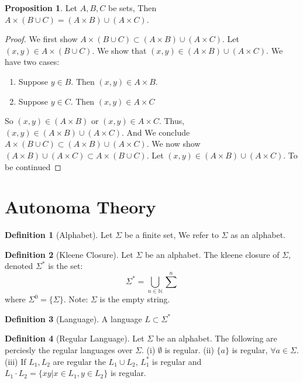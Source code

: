 \documentclass{article}
\theoremstyle{definition}
\newtheorem{define}{Definition}[section]
\newtheorem{prop}{Proposition}[section]
\begin{document}
\begin{prop}
Let $A, B, C$ be sets, Then $A\times (B\cup C) = (A\times B)\cup (A\times C)$. 
\end{prop}
\begin{proof}
We first show $A\times (B\cup C) \subset (A\times B) \cup (A\times C)$. Let $(x,y) \in A \times (B\cup C)$. We show that $(x,y)\in (A\times B)\cup (A\times C)$.  We have two cases:
	\begin{enumerate}
		\item Suppose $y\in B$. Then $(x,y)\in A\times B$.
		\item Suppose $y\in C$. Then $(x,y)\in A\times C$
	\end{enumerate}
So $(x,y) \in (A\times B)$ or $(x,y)\in A\times C$. Thus, $(x,y)\in (A\times B) \cup (A\times C)$. And We conclude $A\times (B\cup C)\subset (A\times B)\cup (A\times C)$. We now show $(A\times B)\cup (A\times C) \subset A \times(B\cup C)$. Let $(x,y)\in (A \times B)\cup (A\times C)$. To be continued
\end{proof}

\section{Autonoma Theory}

\begin{define}[Alphabet] 
Let $\Sigma$ be a finite set, We refer to $\Sigma$ as an alphabet.
\end{define}

\begin{define}[Kleene Closure] 
Let $\Sigma$ be an alphabet. The kleene closure of $\Sigma$, denoted $\Sigma^*$ is the set: $$\Sigma^* = \bigcup_{n\in \mathbb{N}}\sum^n$$ where $\Sigma^0=\{\Sigma\}$. Note: $\Sigma$ is the empty string.
\end{define}

\begin{define}[Language]
A language $L \subset \Sigma^*$
\end{define}

\begin{define}[Regular Language]
Let $\Sigma$ be an alphabet. The following are perciesly the regular languages over $\Sigma$. (i) $\emptyset$ is regular. (ii) $\{a\}$ is regular, $\forall a\in \Sigma$. (iii) If $L_1, L_2$ are regular the $L_1 \cup L_2$, $L_1^*$ is regular and $L_1 \cdot L_2 = \{xy|x \in L_1, y\in L_2\}$ is regular.
\end{define}
\end{document}

